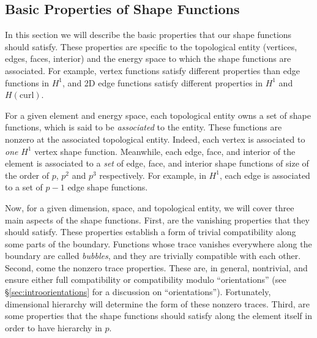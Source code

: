 \subsection{Basic Properties of Shape Functions}

In this section we will describe the basic properties that our shape functions should satisfy.
These properties are specific to the topological entity (vertices, edges, faces, interior) and the energy space to which the shape functions are associated.
For example, vertex functions satisfy different properties than edge functions in $H^1$, and 2D edge functions satisfy different properties in $H^1$ and $H(\mathrm{curl})$.

For a given element and energy space, each topological entity owns a set of shape functions, which is said to be \textit{associated} to the entity.
These functions are nonzero at the associated topological entity.
Indeed, each vertex is associated to \textit{one} $H^1$ vertex shape function.
Meanwhile, each edge, face, and interior of the element is associated to a \textit{set} of edge, face, and interior shape functions of size of the order of $p$, $p^2$ and $p^3$ respectively.
For example, in $H^1$, each edge is associated to a set of $p-1$ edge shape functions.

Now, for a given dimension, space, and topological entity, we will cover three main aspects of the shape functions.
First, are the vanishing properties that they should satisfy.
These properties establish a form of trivial compatibility along some parts of the boundary.
Functions whose trace vanishes everywhere along the boundary are called \textit{bubbles}, and they are trivially compatible with each other.
Second, come the nonzero trace properties.
These are, in general, nontrivial, and ensure either full compatibility or compatibility modulo ``orientations'' (see \S\ref{sec:introorientations} for a discussion on ``orientations'').
Fortunately, dimensional hierarchy will determine the form of these nonzero traces.
Third, are some properties that the shape functions should satisfy along the element itself in order to have hierarchy in $p$.


